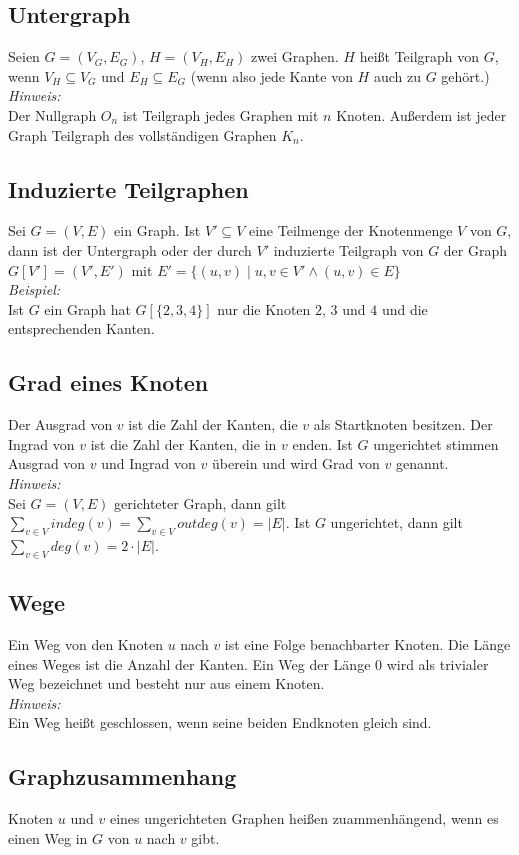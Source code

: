\subsection*{Untergraph}
Seien $G=(V_G,E_G)$, $H=(V_H,E_H)$ zwei Graphen. $H$ heißt Teilgraph von $G$, wenn $V_H\subseteq V_G$ und $E_H\subseteq E_G$
(wenn also jede Kante von $H$ auch zu $G$ gehört.)\\
\emph{Hinweis:}\\
Der Nullgraph $O_n$ ist Teilgraph jedes Graphen mit $n$ Knoten. Außerdem ist jeder Graph Teilgraph des vollständigen Graphen $K_n$.
\subsection*{Induzierte Teilgraphen}
Sei $G=(V,E)$ ein Graph. Ist $V'\subseteq V$ eine Teilmenge der Knotenmenge $V$ von $G$, dann ist der Untergraph oder
der durch $V'$ induzierte Teilgraph von $G$ der Graph $G[V']=(V',E')$ mit $E'=\{(u,v)\mid u,v\in V'\wedge (u,v)\in E\}$\\
\emph{Beispiel:}\\
Ist $G$ ein Graph hat $G[\{2,3,4\}]$ nur die Knoten $2$, $3$ und $4$ und die entsprechenden Kanten.
\subsection*{Grad eines Knoten}
Der Ausgrad von $v$ ist die Zahl der Kanten, die $v$ als Startknoten besitzen.
Der Ingrad von $v$ ist die Zahl der Kanten, die in $v$ enden.
Ist $G$ ungerichtet stimmen Ausgrad von $v$ und Ingrad von $v$ überein und wird Grad von $v$ genannt.\\
\emph{Hinweis:}\\
Sei $G=(V,E)$ gerichteter Graph, dann gilt $\sum_{v\in V} indeg(v)=\sum_{v\in V} outdeg(v)=|E|$.
Ist $G$ ungerichtet, dann gilt $\sum_{v\in V} deg(v)=2\cdot |E|$.
\subsection*{Wege}
Ein Weg von den Knoten $u$ nach $v$ ist eine Folge benachbarter Knoten. Die Länge
eines Weges ist die Anzahl der Kanten. Ein Weg der Länge $0$ wird als trivialer Weg bezeichnet und besteht nur aus einem Knoten.\\
\emph{Hinweis:}\\
Ein Weg heißt geschlossen, wenn seine beiden Endknoten gleich sind.
\subsection*{Graphzusammenhang}
Knoten $u$ und $v$ eines ungerichteten Graphen heißen zuammenhängend, wenn es
einen Weg in $G$ von $u$ nach $v$ gibt.

